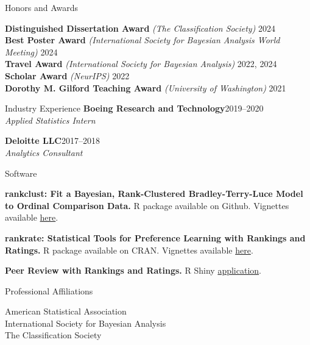\documentclass{resume} %
\begin{document}
\begin{rSection}{Honors and Awards}

\textbf{Distinguished Dissertation Award} {\it (The Classification Society)} \hfill {2024}
\\ \textbf{Best Poster Award} {\it (International Society for Bayesian Analysis World Meeting)} \hfill {2024}
\\ \textbf{Travel Award} {\it (International Society for Bayesian Analysis)} \hfill {2022, 2024}
\\ \textbf{Scholar Award} {\it (NeurIPS)} \hfill {2022}
\\ \textbf{Dorothy M. Gilford Teaching Award} {\it (University of Washington)} \hfill {2021}

\end{rSection}


\begin{rSection}{Industry Experience}
\textbf{Boeing Research and Technology}\hfill{2019--2020}
\\{\it Applied Statistics Intern}

\textbf{Deloitte LLC}\hfill{2017--2018}
\\{\it Analytics Consultant}

\end{rSection}

\begin{rSection}{Software}

\textbf{rankclust: Fit a Bayesian, Rank-Clustered Bradley-Terry-Luce Model to Ordinal Comparison Data.} R package available on Github. Vignettes available \href{https://pearce790.github.io/rankclust/}{here}.

\textbf{rankrate: Statistical Tools for Preference Learning with Rankings and Ratings.} R package available on CRAN. Vignettes available \href{https://pearce790.github.io/rankrate/}{here}.

\textbf{Peer Review with Rankings and Ratings.} R Shiny \href{https://pearce790.shinyapps.io/rankrate_PeerReview/}{application}.

\end{rSection}

\begin{rSection}{Professional Affiliations}

American Statistical Association
\\ International Society for Bayesian Analysis
\\ The Classification Society

\end{rSection}
\end{document}
